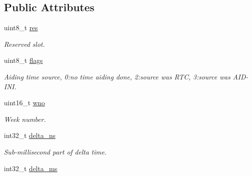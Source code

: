 \subsection*{Public Attributes}
\begin{DoxyCompactItemize}
\item 
\hypertarget{structubx__tim__vrfy__t_a0fcdf1a1c135f7bf04fc37ae9eedfd7c}{uint8\+\_\+t \hyperlink{structubx__tim__vrfy__t_a0fcdf1a1c135f7bf04fc37ae9eedfd7c}{res}}\label{structubx__tim__vrfy__t_a0fcdf1a1c135f7bf04fc37ae9eedfd7c}

\begin{DoxyCompactList}\small\item\em Reserved slot. \end{DoxyCompactList}\item 
\hypertarget{structubx__tim__vrfy__t_acc3c0348de3bddea5815b1a6b2612413}{uint8\+\_\+t \hyperlink{structubx__tim__vrfy__t_acc3c0348de3bddea5815b1a6b2612413}{flags}}\label{structubx__tim__vrfy__t_acc3c0348de3bddea5815b1a6b2612413}

\begin{DoxyCompactList}\small\item\em Aiding time source, 0\+:no time aiding done, 2\+:source was R\+T\+C, 3\+:source was A\+I\+D-\/\+I\+N\+I. \end{DoxyCompactList}\item 
\hypertarget{structubx__tim__vrfy__t_aee8d79b409dab55d7ca9b7979e92103d}{uint16\+\_\+t \hyperlink{structubx__tim__vrfy__t_aee8d79b409dab55d7ca9b7979e92103d}{wno}}\label{structubx__tim__vrfy__t_aee8d79b409dab55d7ca9b7979e92103d}

\begin{DoxyCompactList}\small\item\em Week number. \end{DoxyCompactList}\item 
\hypertarget{structubx__tim__vrfy__t_aaa62860e97ae15d893b4ec56fabe0c9a}{int32\+\_\+t \hyperlink{structubx__tim__vrfy__t_aaa62860e97ae15d893b4ec56fabe0c9a}{delta\+\_\+ns}}\label{structubx__tim__vrfy__t_aaa62860e97ae15d893b4ec56fabe0c9a}

\begin{DoxyCompactList}\small\item\em Sub-\/millisecond part of delta time. \end{DoxyCompactList}\item 
\hypertarget{structubx__tim__vrfy__t_a38eaa34141a19d2864e7228752cdd8bf}{int32\+\_\+t \hyperlink{structubx__tim__vrfy__t_a38eaa34141a19d2864e7228752cdd8bf}{delta\+\_\+ms}}\label{structubx__tim__vrfy__t_a38eaa34141a19d2864e7228752cdd8bf}


\end{DoxyCompactItemize}
